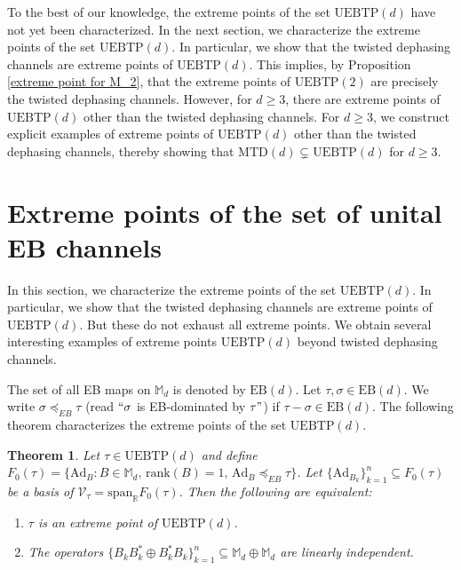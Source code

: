 \documentclass[11pt,reqno]{amsart}
\theoremstyle{definition}
\theoremstyle{plain}
\newtheorem{thm}[defn]{Theorem}
\theoremstyle{remark}
\numberwithin{equation}{section}%
\begin{document}
 
 
 To the best of our knowledge, the extreme points of the set $\mathrm{UEBTP}(d)$ have not yet been characterized. In the next section, we characterize the extreme points of the set $\mathrm{UEBTP}(d)$. In particular, we show that the twisted dephasing channels are extreme points of $\mathrm{UEBTP}(d)$. This implies, by Proposition \ref{extreme point for M_2}, that the extreme points of $\mathrm{UEBTP}(2)$ are precisely the twisted dephasing channels. However, for $d\geq 3$, there are extreme points of $\mathrm{UEBTP}(d)$ other than the twisted dephasing channels. For $d\geq 3$, we construct explicit examples of extreme points of $\mathrm{UEBTP}(d)$ other than the twisted dephasing channels, thereby showing that $\mathrm{MTD}(d)\subsetneq\mathrm{UEBTP}(d)$ for $d\geq 3$. 
 
 






\section{Extreme points of the set of unital EB channels}\label{extreme point of UEBTP}


In this section, we characterize the extreme points of the set $\mathrm{UEBTP}(d)$. In particular, we show that the twisted dephasing channels are extreme points of $\mathrm{UEBTP}(d)$. But these do not exhaust all extreme points. We obtain several interesting examples of extreme points $\mathrm{UEBTP}(d)$ beyond twisted dephasing channels.


The set of all EB maps on $\mathbb{M}_d$ is denoted by $\mathrm{EB}(d)$. Let $\tau, \sigma\in\mathrm{EB}(d)$. We write $\sigma \preccurlyeq_{EB}\tau$ (read $``\sigma$ is EB-dominated by $\tau"$) if $\tau - \sigma\in\mathrm{EB}(d)$. The following theorem characterizes the extreme points of the set $\mathrm{UEBTP}(d)$.


\begin{thm}\label{EMD:thm6}
	Let $\tau\in\mathrm{UEBTP}(d)$ and define $F_0(\tau) = \{\text{Ad}_B : B \in \mathbb{M}_d, \, \text{rank}(B)=1, \, \text{Ad}_B \preccurlyeq_{EB} \tau\}$. Let $\{\text{Ad}_{B_k}\}_{k=1}^n \subseteq F_0(\tau)$ be a basis of $\mathcal{V}_{\tau}=\text{span}_{\mathbb{R}} F_0(\tau)$. Then the following are equivalent:
	\begin{enumerate}
		\item $\tau$ is an extreme point of $\mathrm{UEBTP}(d)$.
		\item The operators $\{B_k B_k^* \oplus B_k^* B_k\}_{k=1}^n \subseteq \mathbb{M}_d \oplus \mathbb{M}_d$ are linearly independent.
	\end{enumerate}
\end{thm}
\end{document}
